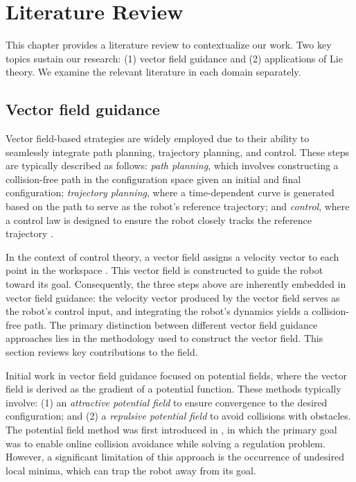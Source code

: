 \chapter{Literature Review} \label{chap:literature-review}
This chapter provides a literature review to contextualize our work. Two key topics sustain our research: (1) vector field guidance and (2) applications of Lie theory. We examine the relevant literature in each domain separately.

\section{Vector field guidance} \label{sec:lit-review-vector-field-guidance}
Vector field-based strategies are widely employed due to their ability to seamlessly integrate path planning, trajectory planning, and control. These steps are typically described as follows: \emph{path planning}, which involves constructing a collision-free path in the configuration space given an initial and final configuration; \emph{trajectory planning}, where a time-dependent curve is generated based on the path to serve as the robot's reference trajectory; and \emph{control}, where a control law is designed to ensure the robot closely tracks the reference trajectory \citep{Rimon1992}.

In the context of control theory, a vector field assigns a velocity vector to each point in the workspace . This vector field is constructed to guide the robot toward its goal. Consequently, the three steps above are inherently embedded in vector field guidance: the velocity vector produced by the vector field serves as the robot's control input, and integrating the robot's dynamics yields a collision-free path. The primary distinction between different vector field guidance approaches lies in the methodology used to construct the vector field. This section reviews key contributions to the field.

Initial work in vector field guidance focused on potential fields, where the vector field is derived as the gradient of a potential function. These methods typically involve: (1) an \emph{attractive potential field} to ensure convergence to the desired configuration; and (2) a \emph{repulsive potential field} to avoid collisions with obstacles. The potential field method was first introduced in \citet{Khatib1985}, in which the primary goal was to enable online collision avoidance while solving a regulation problem. However, a significant limitation of this approach is the occurrence of undesired local minima, which can trap the robot away from its goal.


